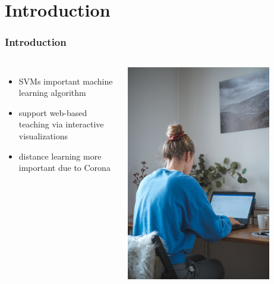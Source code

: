 \documentclass[english,hangout]{beamer}
\begin{document}
\section{Introduction}
\begin{frame}
	\frametitle{Introduction}

\begin{columns}
	\begin{itemize}
		\item SVMs important machine learning algorithm
		\item support web-based teaching via interactive visualizations
		\item distance learning more important due to Corona
	\end{itemize}
	\includegraphics[width=0.8\textwidth]{images/Beamer/home_office_by_jan-baborak.jpg}
\end{columns}

  
  
\end{frame}
\end{document}
